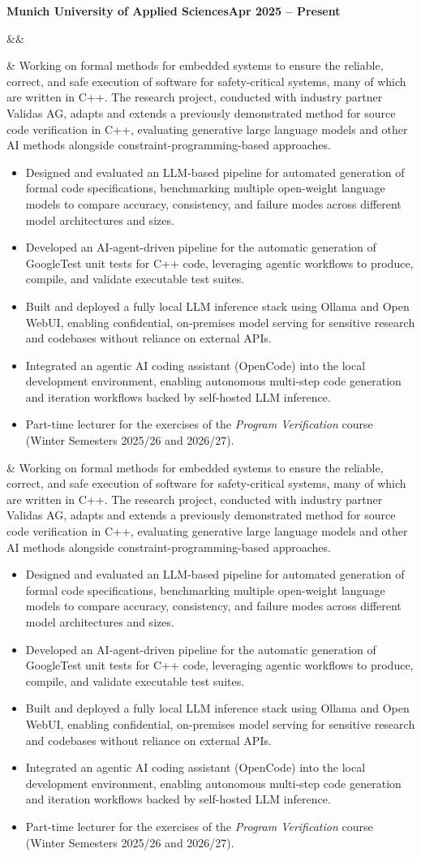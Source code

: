 \documentclass[10pt,a4paper]{article}
\newcommand{\cventry}[4]{%
  \textbf{#1}\hfill\textbf{#2}\par
  \ifx&#3&\else\textit{#3}\par\fi
  \ifx&#4&\else\vspace{2pt}#4\par\fi
}
\begin{document}
\cventry{Munich University of Applied Sciences}{Apr 2025 -- Present}{}{%
Working on formal methods for embedded systems to ensure the reliable, correct, and safe execution of software for safety-critical systems, many of which are written in C++. The research project, conducted with industry partner Validas AG, adapts and extends a previously demonstrated method for source code verification in C++, evaluating generative large language models and other AI methods alongside constraint-programming-based approaches.
\begin{itemize}
  \item Designed and evaluated an LLM-based pipeline for automated generation of formal code specifications, benchmarking multiple open-weight language models to compare accuracy, consistency, and failure modes across different model architectures and sizes.
  \item Developed an AI-agent-driven pipeline for the automatic generation of GoogleTest unit tests for C++ code, leveraging agentic workflows to produce, compile, and validate executable test suites.
  \item Built and deployed a fully local LLM inference stack using Ollama and Open WebUI, enabling confidential, on-premises model serving for sensitive research and codebases without reliance on external APIs.
  \item Integrated an agentic AI coding assistant (OpenCode) into the local development environment, enabling autonomous multi-step code generation and iteration workflows backed by self-hosted LLM inference.
  \item Part-time lecturer for the exercises of the \textit{Program Verification} course (Winter Semesters 2025/26 and 2026/27).
\end{itemize}}
\end{document}
